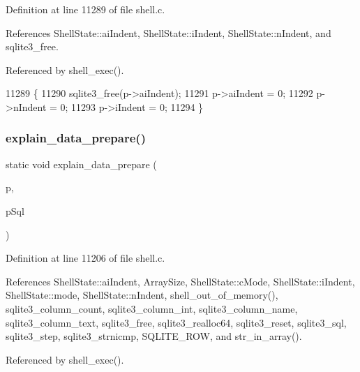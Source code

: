Definition at line 11289 of file shell.\+c.



References Shell\+State\+::ai\+Indent, Shell\+State\+::i\+Indent, Shell\+State\+::n\+Indent, and sqlite3\+\_\+free.



Referenced by shell\+\_\+exec().


\begin{DoxyCode}
11289                                               \{
11290   sqlite3_free(p->aiIndent);
11291   p->aiIndent = 0;
11292   p->nIndent = 0;
11293   p->iIndent = 0;
11294 \}
\end{DoxyCode}
\mbox{\label{shell_8c_ab3d16510062eb32cbb278eaf8d92bf40}} 
\subsubsection{explain\+\_\+data\+\_\+prepare()}
{\footnotesize\ttfamily static void explain\+\_\+data\+\_\+prepare (\begin{DoxyParamCaption}\item[{\textbf{ Shell\+State} $\ast$}]{p,  }\item[{\textbf{ sqlite3\+\_\+stmt} $\ast$}]{p\+Sql }\end{DoxyParamCaption})\hspace{0.3cm}{\ttfamily [static]}}



Definition at line 11206 of file shell.\+c.



References Shell\+State\+::ai\+Indent, Array\+Size, Shell\+State\+::c\+Mode, Shell\+State\+::i\+Indent, Shell\+State\+::mode, Shell\+State\+::n\+Indent, shell\+\_\+out\+\_\+of\+\_\+memory(), sqlite3\+\_\+column\+\_\+count, sqlite3\+\_\+column\+\_\+int, sqlite3\+\_\+column\+\_\+name, sqlite3\+\_\+column\+\_\+text, sqlite3\+\_\+free, sqlite3\+\_\+realloc64, sqlite3\+\_\+reset, sqlite3\+\_\+sql, sqlite3\+\_\+step, sqlite3\+\_\+strnicmp, S\+Q\+L\+I\+T\+E\+\_\+\+R\+OW, and str\+\_\+in\+\_\+array().



Referenced by shell\+\_\+exec().


